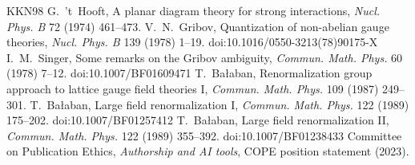 \documentclass[11pt,a4paper]{article}
\begin{document}
\begin{thebibliography}{KKN98}
 G.~'t~Hooft, A planar diagram theory for strong interactions, \emph{Nucl. Phys. B} 72 (1974) 461--473.
 V.~N.~Gribov, Quantization of non-abelian gauge theories, \emph{Nucl. Phys. B} 139 (1978) 1--19. doi:10.1016/0550-3213(78)90175-X
 I.~M.~Singer, Some remarks on the Gribov ambiguity, \emph{Commun. Math. Phys.} 60 (1978) 7--12. doi:10.1007/BF01609471
 T.~Ba{\l}aban, Renormalization group approach to lattice gauge field theories I, \emph{Commun. Math. Phys.} 109 (1987) 249--301.
 T.~Ba{\l}aban, Large field renormalization I, \emph{Commun. Math. Phys.} 122 (1989) 175--202. doi:10.1007/BF01257412
 T.~Ba{\l}aban, Large field renormalization II, \emph{Commun. Math. Phys.} 122 (1989) 355--392. doi:10.1007/BF01238433
 Committee on Publication Ethics, \emph{Authorship and AI tools}, COPE position statement (2023).
\end{thebibliography}
\end{document}
